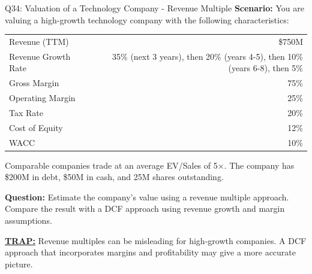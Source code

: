 \documentclass{beamer}
\renewcommand{\scriptsize}{\fontsize{6pt}{7pt}\selectfont}
\begin{document}
	\begin{frame}{Q34: Valuation of a Technology Company - Revenue Multiple}
		\scriptsize
		\textbf{Scenario:} You are valuing a high-growth technology company with the following characteristics:
		
		\begin{tabular}{lr}
			Revenue (TTM) & \$750M \\
			Revenue Growth Rate & 35\% (next 3 years), then 20\% (years 4-5), then 10\% (years 6-8), then 5\% \\
			Gross Margin & 75\% \\
			Operating Margin & 25\% \\
			Tax Rate & 20\% \\
			Cost of Equity & 12\% \\
			WACC & 10\% \\
		\end{tabular}
		
		Comparable companies trade at an average EV/Sales of 5×. The company has \$200M in debt, \$50M in cash, and 25M shares outstanding.
		
		\textbf{Question:} Estimate the company's value using a revenue multiple approach. Compare the result with a DCF approach using revenue growth and margin assumptions.
		
		\vspace{2pt}
		\underline{\textbf{TRAP:}} Revenue multiples can be misleading for high-growth companies. A DCF approach that incorporates margins and profitability may give a more accurate picture.
	\end{frame}
	
\end{document}
